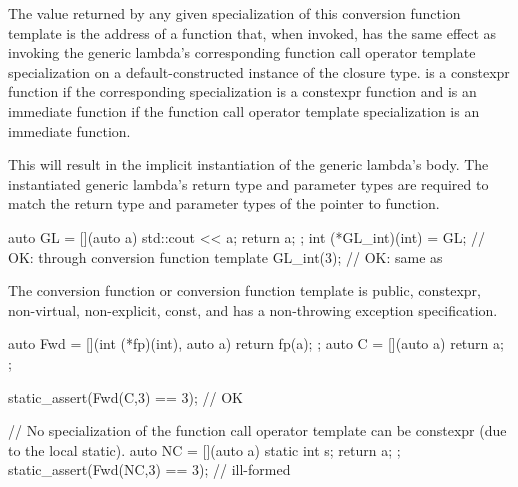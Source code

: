 \pnum
The value returned by any given specialization of this conversion function
template is the address of a function  that, when invoked, has the same
effect as invoking the generic lambda's corresponding function call operator
template specialization on a default-constructed instance of the closure type.
 is a constexpr function
if the corresponding specialization is a constexpr function and
 is an immediate function
if the function call operator template specialization is an immediate function.
\begin{note}
This will result in the implicit instantiation of the generic lambda's body.
The instantiated generic lambda's return type and parameter types are required to match
the return type and parameter types of the pointer to function.
\end{note}
\begin{example}
\begin{codeblock}
auto GL = [](auto a) { std::cout << a; return a; };
int (*GL_int)(int) = GL;        // OK: through conversion function template
GL_int(3);                      // OK: same as 
\end{codeblock}
\end{example}

\pnum
The conversion function or conversion function template is public,
constexpr, non-virtual, non-explicit, const, and has a non-throwing exception
specification.
\begin{example}
\begin{codeblock}
auto Fwd = [](int (*fp)(int), auto a) { return fp(a); };
auto C = [](auto a) { return a; };

static_assert(Fwd(C,3) == 3);   // OK

// No specialization of the function call operator template can be constexpr (due to the local static).
auto NC = [](auto a) { static int s; return a; };
static_assert(Fwd(NC,3) == 3);  // ill-formed
\end{codeblock}
\end{example}


